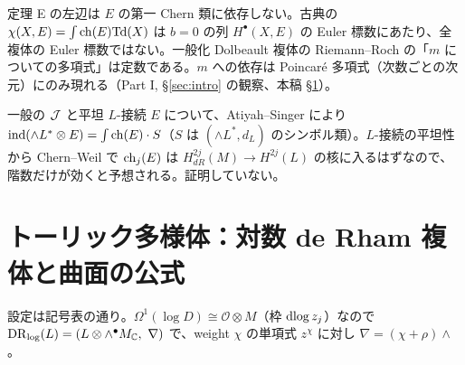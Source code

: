\begin{rem}[意味\ \tP]
定理 E の左辺は $E$ の第一 Chern 類に依存しない。古典の $\chi(X,E)=\int\mathrm{ch}(E)\mathrm{Td}(X)$ は $b=0$ の列 $H^\bullet(X,E)$ の Euler 標数にあたり、全複体の Euler 標数ではない。一般化 Dolbeault 複体の Riemann--Roch の「$m$ についての多項式」は定数である。$m$ への依存は Poincaré 多項式（次数ごとの次元）にのみ現れる（Part I, \S\ref{sec:intro} の観察、本稿 \S\ref{sec:toric}）。
\end{rem}
\begin{rem}[一般の一般化複素構造\ \tK]
一般の $\mathcal J$ と平坦 $L$-接続 $E$ について、Atiyah--Singer により $\mathrm{ind}(\wedge L^*\otimes E)=\int\mathrm{ch}(E)\cdot S$（$S$ は $(\wedge L^*,d_L)$ のシンボル類）。$L$-接続の平坦性から Chern--Weil で $\mathrm{ch}_j(E)$ は $H^{2j}_{dR}(M)\to H^{2j}(L)$ の核に入るはずなので、階数だけが効くと予想される。証明していない。
\end{rem}

\section{トーリック多様体：対数 de Rham 複体と曲面の公式}\label{sec:toric}
設定は記号表の通り。$\Omega^1(\log D)\cong\mathcal O\otimes M$（枠 $\mathrm{dlog}\, z_j$）なので $\mathrm{DR}_{\log}(L)=(L\otimes\wedge^\bullet M_\mathbb C,\ \nabla)$ で、weight $\chi$ の単項式 $z^\chi$ に対し $\nabla=(\chi+\rho)\wedge$。

